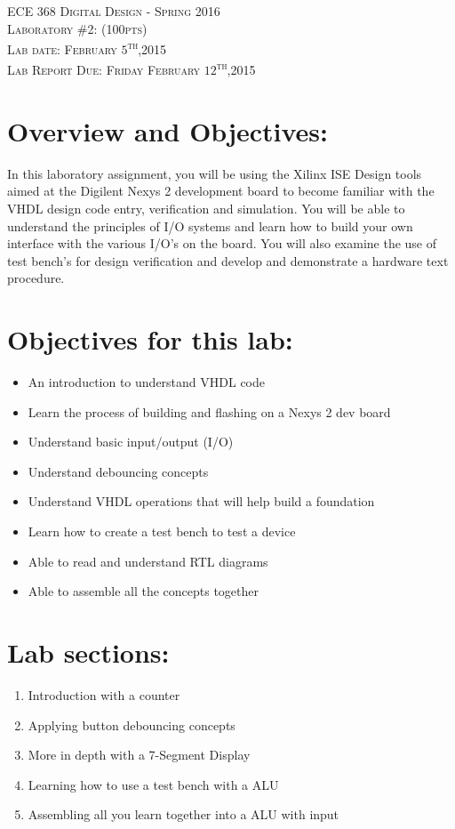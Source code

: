 \documentclass{article}
\begin{document}
\begin{center}
\textsc{\huge ECE 368 Digital Design - Spring 2016}\\[1cm]
\textsc{{\LARGE Laboratory \#2: (100pts)}}\\[0.5cm]
\textsc{\Large Lab date: February $5$\textsuperscript{th},2015}\\[0.5cm]
\textsc{\Large Lab Report Due: Friday February $12$\textsuperscript{th},2015}\\[1cm]
\end{center}

\section{Overview and Objectives:}
In this laboratory assignment, you will be using the Xilinx ISE Design tools aimed at the Digilent Nexys 2 development board to become familiar with the VHDL design code entry, verification and simulation. You will be able to understand the principles of I/O systems and learn how to build your own interface with the various I/O's on the board. You will also examine the use of test bench's for design verification and develop and demonstrate a hardware text procedure.

\section{Objectives for this lab:}
\begin{itemize}
  \item An introduction to understand VHDL code
  \item Learn the process of building and flashing on a Nexys 2 dev board
  \item Understand basic input/output (I/O)
  \item Understand debouncing concepts
  \item Understand VHDL operations that will help build a foundation
  \item Learn how to create a test bench to test a device
  \item Able to read and understand RTL diagrams
  \item Able to assemble all the concepts together
\end{itemize}

\section{Lab sections:}
\begin{enumerate}
  \item Introduction with a counter
  \item Applying button debouncing concepts
  \item More in depth with a 7-Segment Display
  \item Learning how to use a test bench with a ALU
  \item Assembling all you learn together into a ALU with input
\end{enumerate}
\end{document}
